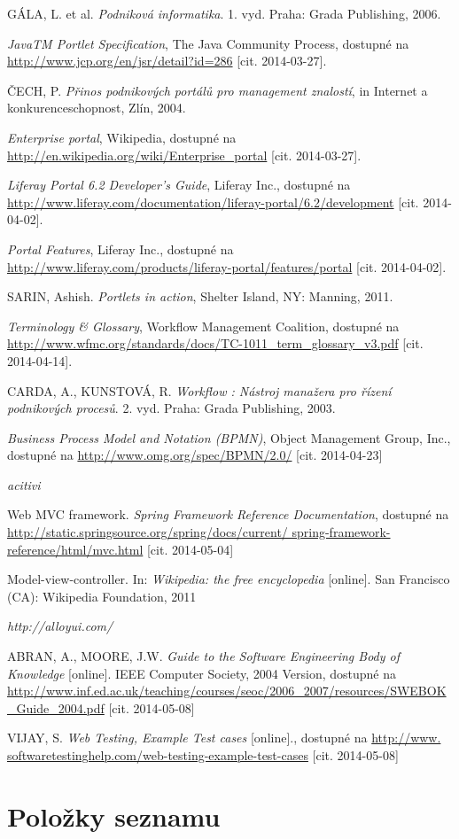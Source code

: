 \documentclass{fithesis}
\begin{document}
\begin{thebibliography}{0}


GÁLA, L. et al. \textit{Podniková informatika}. 1. vyd. Praha: Grada Publishing, 2006. 

\textit{JavaTM Portlet Specification}, The Java Community Process, dostupné na \url{http://www.jcp.org/en/jsr/detail?id=286} [cit. 2014-03-27].

ČECH, P. \textit {Přinos podnikových portálů pro management znalostí}, in Internet a konkurenceschopnost, Zlín, 2004.

\textit{Enterprise portal}, Wikipedia, dostupné na \url{http://en.wikipedia.org/wiki/Enterprise_portal} [cit. 2014-03-27].

\textit{Liferay Portal 6.2 Developer's Guide}, Liferay Inc., dostupné na \url{http://www.liferay.com/documentation/liferay-portal/6.2/development} [cit. 2014-04-02].

\textit{Portal Features}, Liferay Inc., dostupné na \url{http://www.liferay.com/products/liferay-portal/features/portal} [cit. 2014-04-02].

SARIN, Ashish. \textit{Portlets in action}, Shelter Island, NY: Manning, 2011.

\textit{Terminology \& Glossary}, Workflow Management Coalition, dostupné na \url{http://www.wfmc.org/standards/docs/TC-1011_term_glossary_v3.pdf} [cit. 2014-04-14].

CARDA, A., KUNSTOVÁ, R. \textit {Workflow : Nástroj manažera pro řízení podnikových procesů}. 2. vyd. Praha: Grada Publishing, 2003.

\textit{Business Process Model and Notation (BPMN)}, Object Management Group, Inc., dostupné na \url{http://www.omg.org/spec/BPMN/2.0/} [cit. 2014-04-23]


\textit{acitivi}

Web MVC framework. \textit{Spring Framework Reference Documentation}, dostupné na \url{http://static.springsource.org/spring/docs/current/
spring-framework-reference/html/mvc.html} [cit. 2014-05-04]

Model-view-controller. In: \textit{Wikipedia: the free encyclopedia} [online]. San Francisco (CA): Wikipedia Foundation, 2011

\textit{http://alloyui.com/}

ABRAN, A., MOORE, J.W. \textit{Guide to the Software Engineering Body of Knowledge} [online]. IEEE Computer Society, 2004 Version, dostupné na \url{http://www.inf.ed.ac.uk/teaching/courses/seoc/2006_2007/resources/SWEBOK_Guide_2004.pdf} [cit. 2014-05-08]

VIJAY, S. \textit{Web Testing, Example Test cases} [online]., dostupné na \url{http://www.
softwaretestinghelp.com/web-testing-example-test-cases} [cit. 2014-05-08]

\end{thebibliography}


\newpage
\appendix
\chapter{Položky seznamu}
\end{document}
